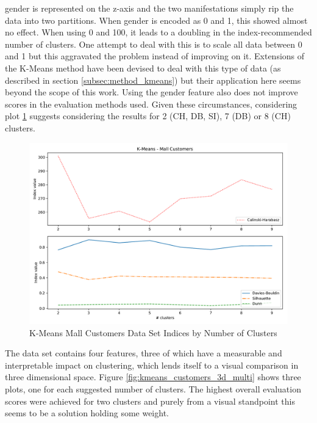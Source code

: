 gender is represented on the z-axis and the two manifestations simply rip the data into two partitions. When gender is encoded as 0 and 1, this showed almost no effect. When using 0 and 100, it leads to a doubling in the index-recommended number of clusters. One attempt to deal with this is to scale all data between 0 and 1 but this aggravated the problem instead of improving on it. Extensions of the K-Means method have been devised to deal with this type of data (as described in section \ref{subsec:method_kmeans}) but their application here seems beyond the scope of this work. Using the gender feature also does not improve scores in the evaluation methods used. Given these circumstances, considering plot \ref{fig:kmeans_customers_indices_plot} suggests considering the results for 2 (\gls{CH}, \gls{DB}, \gls{SI}), 7 (\gls{DB}) or 8 (\gls{CH}) clusters.

\begin{figure}[H]
\begin{center}
\includegraphics[width=1.0\textwidth]{images/kmeans_customers_index_plot.pdf}
\end{center}
\caption{K-Means Mall Customers Data Set Indices by Number of Clusters}
\label{fig:kmeans_customers_indices_plot}
\end{figure}

The data set contains four features, three of which have a measurable and interpretable impact on clustering, which lends itself to a visual comparison in three dimensional space. Figure \ref{fig:kmeans_customers_3d_multi} shows three plots, one for each suggested number of clusters. The highest overall evaluation scores were achieved for two clusters and purely from a visual standpoint this seems to be a solution holding some weight. 


